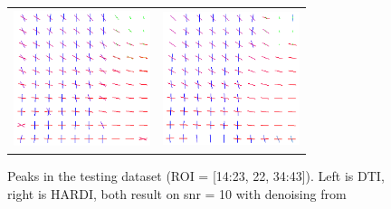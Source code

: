 \documentclass[9pt,conference,a4paper]{IEEEtran}
\begin{document}
\begin{figure}
\centering
\begin{tabular}{c  c}
	\includegraphics[width=40mm,height=40mm]{dti_slice=22_sel=33_NC=3_iso=1_fr=0_snr=10_type=6_white.png} & \includegraphics[width=40mm,height=40mm]{hardi_slice=22_sel=33_NC=3_iso=1_fr=0_snr=10_type=6_white.png}\\
\end{tabular}
\caption{Peaks in the testing dataset (ROI = [14:23, 22, 34:43]). Left is DTI, right is HARDI, both result on snr = 10 with denoising from \cite{manjon-coupe:10}}
\end{figure}




%
%
\end{document}
